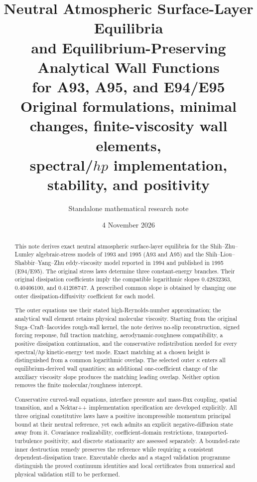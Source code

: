 \documentclass[11pt,a4paper]{article}
\title{\Large\bfseries Neutral Atmospheric Surface-Layer Equilibria\\[3pt]
and Equilibrium-Preserving Analytical Wall Functions\\[3pt]
for A93, A95, and E94/E95\\[7pt]
\large Original formulations, minimal changes, finite-viscosity wall elements,\\
spectral/$hp$ implementation, stability, and positivity}
\author{Standalone mathematical research note}
\date{4 November 2026}
\numberwithin{equation}{section}
\begin{document}
\maketitle
\begin{abstract}
This note derives exact neutral atmospheric surface-layer equilibria for
the Shih--Zhu--Lumley algebraic-stress models of 1993 and 1995 (A93 and A95)
and the Shih--Liou--Shabbir--Yang--Zhu eddy-viscosity model reported in 1994
and published in 1995 (E94/E95). The original stress laws determine three
constant-energy branches. Their original dissipation coefficients imply
the compatible logarithmic slopes
$0.42832363$, $0.40406100$, and $0.41208747$.
A prescribed common slope is obtained by changing one outer
dissipation-diffusivity coefficient for each model.

The outer equations use their stated high-Reynolds-number approximation;
the analytical wall element retains physical molecular viscosity.
Starting from the original Suga--Craft--Iacovides rough-wall kernel, the
note derives no-slip reconstruction, signed forcing response, full
traction matching, aerodynamic-roughness compatibility, a positive
dissipation continuation, and the conservative redistribution needed for
every spectral/$hp$ kinetic-energy test mode. Exact matching at a chosen
height is distinguished from a common logarithmic overlap. The selected
outer $\kappa$ enters all equilibrium-derived wall quantities; an
additional one-coefficient change of the auxiliary viscosity slope
produces the matching leading overlap. Neither option removes the
finite molecular/roughness intercept.

Conservative curved-wall equations, interface pressure and mass-flux
coupling, spatial transition, and a Nektar++ implementation specification
are developed explicitly. All three original constitutive laws have a
positive incompressible momentum principal bound at their neutral
reference, yet each admits an explicit negative-diffusion state away
from it. Covariance realizability, coefficient-domain restrictions,
transported-turbulence positivity, and discrete stationarity are assessed
separately. A bounded-rate inner destruction remedy preserves the
reference while requiring a consistent dependent-dissipation trace.
Executable checks and a staged validation programme distinguish the
proved continuum identities and local certificates from numerical and
physical validation still to be performed.
\end{abstract}
\newpage
{\small\tableofcontents}
\newpage
\end{document}
